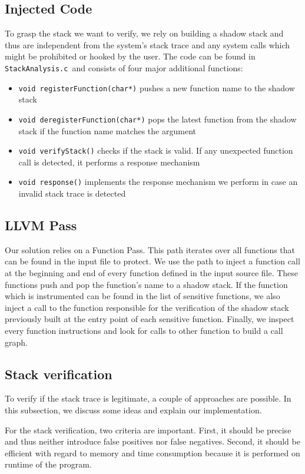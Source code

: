 \documentclass{llncs}
\newcommand{\stacka}{\texttt{StackAnalysis.c }}
\begin{document}
\subsection{Injected Code}
To grasp the stack we want to verify, we rely on building a shadow stack and thus are independent from the system's stack trace and any system calls which might be prohibited or hooked by the user. The code can be found in \stacka and consists of four major additional functions:
\begin{itemize}
\item \texttt{void registerFunction(char*)} pushes a new function name to the shadow stack
\item \texttt{void deregisterFunction(char*)} pops the latest function from the shadow stack if the function name matches the argument
\item \texttt{void verifyStack()} checks if the stack is valid. If any unexpected function call is detected, it performs a response mechanism
\item \texttt{void response()} implements the response mechanism we perform in case an invalid stack trace is detected
\end{itemize}

\subsection{LLVM Pass}
Our solution relies on a Function Pass. This path iterates over all functions that can be found in the input file to protect. We use the path to inject a function call at the beginning and end of every function defined in the input source file. These functions push and pop the function's name to a shadow stack. If the function which is instrumented can be found in the list of sensitive functions, we also inject a call to the function responsible for the verification of the shadow stack previously built at the entry point of each sensitive function. Finally, we inspect every function instructions and look for calls to other function to build a call graph.

\subsection{Stack verification}
To verify if the stack trace is legitimate, a couple of approaches are possible. In this subsection, we discuss some ideas and explain our implementation.

For the stack verification, two criteria are important. First, it should be precise and thus neither introduce false positives nor false negatives. Second, it should be efficient with regard to memory and time consumption because it is performed on runtime of the program.
\end{document}
